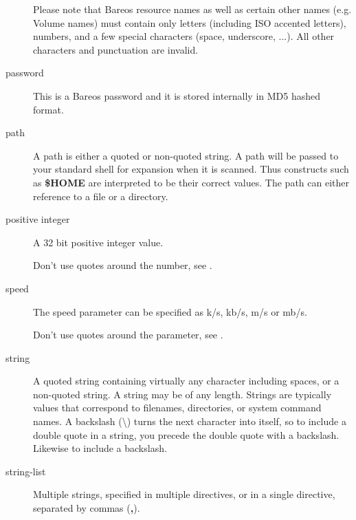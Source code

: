 \begin{description}
Please note that Bareos resource names as well as certain other
names (e.g. Volume names) must contain only letters (including ISO accented
letters), numbers, and a few special characters (space, underscore, ...).
All other characters and punctuation are invalid.


\item [password]
    \label{DataTypePassword}
   This is a Bareos password and it is stored internally in MD5 hashed format.



\item [path]
    \label{DataTypeDirectory}
   A path is either a quoted or  non-quoted string. A path will be
passed to your  standard shell for expansion when it is scanned. Thus
constructs such as {\bf \$HOME} are interpreted to be  their correct values.
The path can either reference to a file or a directory.


\item [positive integer]
    \label{DataTypePositiveInteger}
   A 32 bit positive integer value.

   Don't use quotes around the number, see .


\item [speed]
    \label{DataTypeSpeed}
    The speed parameter can be specified as k/s, kb/s, m/s or mb/s.

    Don't use quotes around the parameter, see .


\item [string]
    \label{DataTypeString}
   A quoted string containing virtually any  character including spaces, or a
non-quoted string. A  string may be of any length. Strings are typically
values  that correspond to filenames, directories, or system  command names. A
backslash (\textbackslash{}) turns the next character into  itself, so to
include a double quote in a string, you precede the  double quote with a
backslash. Likewise to include a backslash.


\item [string-list]
    \label{DataTypeStringList}
    Multiple strings, specified in multiple directives, or in a single directive, separated by commas (\textbf{,}).


\end{description}
